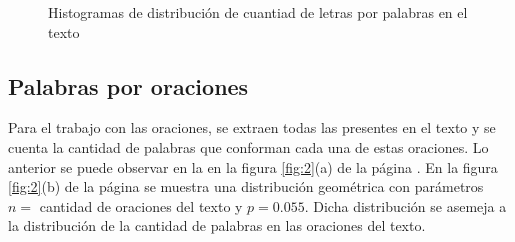 \documentclass{article}
\begin{document}
\begin{figure}
\centering
{}
\label{fig:a}
\centering
{}
\label{fig:b}
\vspace{-0.2cm}
\caption{Histogramas de distribución de cuantiad de letras por palabras en el texto}
\label{fig:1} 
\end{figure}


 \subsection{Palabras por oraciones}
  Para el trabajo con las oraciones, se extraen todas las presentes en el texto y se cuenta la cantidad de palabras que conforman cada una de estas oraciones. Lo anterior se puede observar en la en la figura \ref{fig:2}(a) de la página \pageref{fig:2}. En la figura \ref{fig:2}(b) de la página \pageref{fig:2} se muestra una distribución geométrica con parámetros $n =$ cantidad de oraciones del texto y $p = 0.055$. Dicha distribución se asemeja a la distribución de la cantidad de palabras en las oraciones del texto.
 
\end{document}
